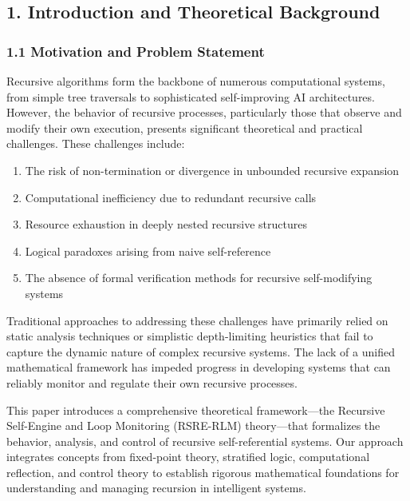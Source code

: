 \documentclass[
]{article}
\providecommand{\tightlist}{%
  \setlength{\itemsep}{0pt}\setlength{\parskip}{0pt}}
\begin{document}
\subsection{1. Introduction and Theoretical
Background}\label{introduction-and-theoretical-background}

\subsubsection{1.1 Motivation and Problem
Statement}\label{motivation-and-problem-statement}

Recursive algorithms form the backbone of numerous computational
systems, from simple tree traversals to sophisticated self-improving AI
architectures. However, the behavior of recursive processes,
particularly those that observe and modify their own execution, presents
significant theoretical and practical challenges. These challenges
include:

\begin{enumerate}
\def\labelenumi{\arabic{enumi}.}
\tightlist
\item
  The risk of non-termination or divergence in unbounded recursive
  expansion
\item
  Computational inefficiency due to redundant recursive calls
\item
  Resource exhaustion in deeply nested recursive structures
\item
  Logical paradoxes arising from naive self-reference
\item
  The absence of formal verification methods for recursive
  self-modifying systems
\end{enumerate}

Traditional approaches to addressing these challenges have primarily
relied on static analysis techniques or simplistic depth-limiting
heuristics that fail to capture the dynamic nature of complex recursive
systems. The lack of a unified mathematical framework has impeded
progress in developing systems that can reliably monitor and regulate
their own recursive processes.

This paper introduces a comprehensive theoretical framework---the
Recursive Self-Engine and Loop Monitoring (RSRE-RLM) theory---that
formalizes the behavior, analysis, and control of recursive
self-referential systems. Our approach integrates concepts from
fixed-point theory, stratified logic, computational reflection, and
control theory to establish rigorous mathematical foundations for
understanding and managing recursion in intelligent systems.
\end{document}
